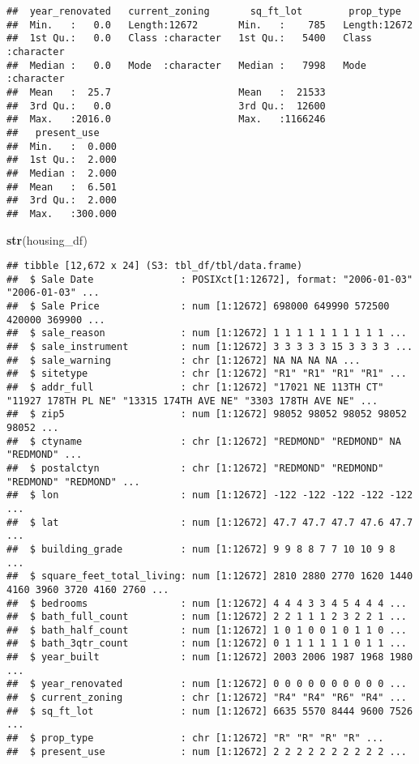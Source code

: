 \documentclass[
]{article}
\newenvironment{Shaded}{\begin{snugshade}}{\end{snugshade}}
\newcommand{\KeywordTok}[1]{\textcolor[rgb]{0.13,0.29,0.53}{\textbf{#1}}}
\newcommand{\NormalTok}[1]{#1}
\begin{document}
\begin{verbatim}
##  year_renovated   current_zoning       sq_ft_lot        prop_type        
##  Min.   :   0.0   Length:12672       Min.   :    785   Length:12672      
##  1st Qu.:   0.0   Class :character   1st Qu.:   5400   Class :character  
##  Median :   0.0   Mode  :character   Median :   7998   Mode  :character  
##  Mean   :  25.7                      Mean   :  21533                     
##  3rd Qu.:   0.0                      3rd Qu.:  12600                     
##  Max.   :2016.0                      Max.   :1166246                     
##   present_use     
##  Min.   :  0.000  
##  1st Qu.:  2.000  
##  Median :  2.000  
##  Mean   :  6.501  
##  3rd Qu.:  2.000  
##  Max.   :300.000
\end{verbatim}

\begin{Shaded}
\begin{Highlighting}[]
\KeywordTok{str}\NormalTok{(housing_df)}
\end{Highlighting}
\end{Shaded}

\begin{verbatim}
## tibble [12,672 x 24] (S3: tbl_df/tbl/data.frame)
##  $ Sale Date               : POSIXct[1:12672], format: "2006-01-03" "2006-01-03" ...
##  $ Sale Price              : num [1:12672] 698000 649990 572500 420000 369900 ...
##  $ sale_reason             : num [1:12672] 1 1 1 1 1 1 1 1 1 1 ...
##  $ sale_instrument         : num [1:12672] 3 3 3 3 3 15 3 3 3 3 ...
##  $ sale_warning            : chr [1:12672] NA NA NA NA ...
##  $ sitetype                : chr [1:12672] "R1" "R1" "R1" "R1" ...
##  $ addr_full               : chr [1:12672] "17021 NE 113TH CT" "11927 178TH PL NE" "13315 174TH AVE NE" "3303 178TH AVE NE" ...
##  $ zip5                    : num [1:12672] 98052 98052 98052 98052 98052 ...
##  $ ctyname                 : chr [1:12672] "REDMOND" "REDMOND" NA "REDMOND" ...
##  $ postalctyn              : chr [1:12672] "REDMOND" "REDMOND" "REDMOND" "REDMOND" ...
##  $ lon                     : num [1:12672] -122 -122 -122 -122 -122 ...
##  $ lat                     : num [1:12672] 47.7 47.7 47.7 47.6 47.7 ...
##  $ building_grade          : num [1:12672] 9 9 8 8 7 7 10 10 9 8 ...
##  $ square_feet_total_living: num [1:12672] 2810 2880 2770 1620 1440 4160 3960 3720 4160 2760 ...
##  $ bedrooms                : num [1:12672] 4 4 4 3 3 4 5 4 4 4 ...
##  $ bath_full_count         : num [1:12672] 2 2 1 1 1 2 3 2 2 1 ...
##  $ bath_half_count         : num [1:12672] 1 0 1 0 0 1 0 1 1 0 ...
##  $ bath_3qtr_count         : num [1:12672] 0 1 1 1 1 1 1 0 1 1 ...
##  $ year_built              : num [1:12672] 2003 2006 1987 1968 1980 ...
##  $ year_renovated          : num [1:12672] 0 0 0 0 0 0 0 0 0 0 ...
##  $ current_zoning          : chr [1:12672] "R4" "R4" "R6" "R4" ...
##  $ sq_ft_lot               : num [1:12672] 6635 5570 8444 9600 7526 ...
##  $ prop_type               : chr [1:12672] "R" "R" "R" "R" ...
##  $ present_use             : num [1:12672] 2 2 2 2 2 2 2 2 2 2 ...
\end{verbatim}
\end{document}
